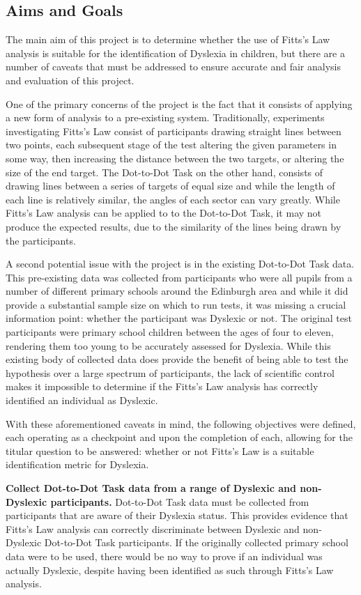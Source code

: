 		\subsection{Aims and Goals}
			The main aim of this project is to determine whether the use of Fitts’s Law analysis is  suitable for the identification of Dyslexia in children, but there are a number of caveats that must be addressed to ensure accurate and fair analysis and evaluation of this project. 
		
			One of the primary concerns of the project is the fact that it consists of applying a new form of analysis to a pre-existing system. Traditionally, experiments investigating Fitts’s Law consist of participants drawing straight lines between two points, each subsequent stage of the test altering the given parameters in some way, then increasing the distance between the two targets, or altering the size of the end target. The Dot-to-Dot Task on the other hand, consists of drawing lines between a series of targets of equal size and while the length of each line is relatively similar, the angles of each sector can vary greatly. While Fitts’s Law analysis can be applied to to the Dot-to-Dot Task, it may not produce the expected results, due to the similarity of the lines being drawn by the participants.
		
			A second potential issue with the project is in the existing Dot-to-Dot Task data. This pre-existing data was collected from participants who were all pupils from a number of different primary schools around the Edinburgh area and while it did provide a substantial sample size on which to run tests, it was missing a crucial information point: whether the participant was Dyslexic or not. The original test participants were primary school children between the ages of four to eleven, rendering them too young to be accurately assessed for Dyslexia. While this existing body of collected data does provide the benefit of being able to test the hypothesis over a large spectrum of participants, the lack of scientific control makes it impossible to determine if the Fitts’s Law analysis has correctly identified an individual as Dyslexic.
		
			With these aforementioned caveats in mind, the following objectives were defined, each operating as a checkpoint and upon the completion of each, allowing for the titular question to be answered: whether or not Fitts’s Law is a suitable identification metric for Dyslexia.
		
			\textbf{Collect Dot-to-Dot Task data from a range of Dyslexic and non-Dyslexic participants.
			}Dot-to-Dot Task data must be collected from participants that are aware of their Dyslexia status. This provides evidence that Fitts’s Law analysis can correctly discriminate between Dyslexic and non-Dyslexic Dot-to-Dot Task participants. If the originally collected primary school data were to be used, there would be no way to prove if an individual was actually Dyslexic, despite having been identified as such through Fitts’s Law analysis.
			
